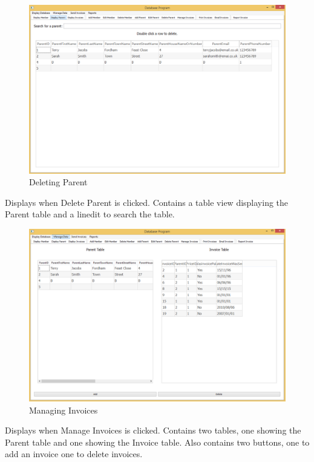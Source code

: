 \begin{figure}[H]
\includegraphics[width=\textwidth]{./Maintenance/Images/DeleteParent.png}
    \caption{Deleting Parent} \label{fig:delete_parent}
\end{figure}

Displays when Delete Parent is clicked. Contains a table view displaying the Parent table and a linedit to search the table.

\begin{figure}[H]
\includegraphics[width=\textwidth]{./Maintenance/Images/ManageInvoice.png}
    \caption{Managing Invoices} \label{fig:manage_invoice}
\end{figure}

Displays when Manage Invoices is clicked. Contains two tables, one showing the Parent table and one showing the Invoice table. Also contains two buttons, one to add an invoice one to delete invoices.

